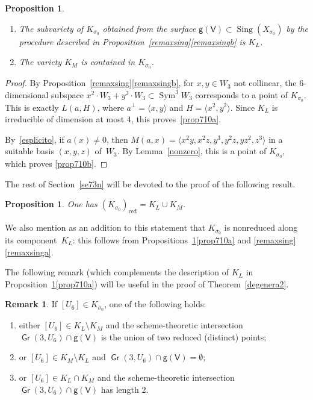 \documentclass[11pt]{article}
\newcommand{\skpt}{\smallskip}
\newenvironment{enumeratea}
{\bgroup\def\theenumi{\alph{enumi}}\def\theenumii{\arabic{enumii}}\begin{enumerate}}
{\end{enumerate}\egroup}
\newtheorem{prop}[lemm]{Proposition}
\theoremstyle{definition}
\newtheorem{rema}[lemm]{Remark}
\newcommand\sfg{\mathsf{g}}
\newcommand\sfV{\mathsf{V}}
\newcommand\gv{\sfg(\sfV)}
\DeclareMathOperator{\Gr}{\mathsf{Gr}}
\let\la\langle
\let\ra\rangle
\DeclareMathOperator{\Sing}{Sing}\let\sing\Sing
\DeclareMathOperator{\Sym}{Sym}
\begin{document}
\skpt
\begin{prop}\label{prop710}
\begin{enumeratea}
\item\label{prop710a}
The subvariety of $K_{\sigma_0}$ obtained from the surface $\gv \subset \Sing(X_{\sigma_0} )$ by the procedure described in Proposition~\ref{remaxsing}\eqref{remaxsingb} is $K_L$.

\item\label{prop710b}
The variety $K_M$ is contained in $K_{\sigma_0}$.
\end{enumeratea}
\end{prop}

\begin{proof}
By Proposition~\ref{remaxsing}\eqref{remaxsingb}, for $x,y\in W_3$ not collinear, the $6$-dimensional subspace $x^2\cdot W_3+y^2\cdot W_3\subset \Sym^3\! W_{3}$ corresponds to a point of $K_{\sigma_0}$. This is exactly $L(a,H)$, where $a^\perp=\la x,y\ra $ and $H=\la x^2,y^2\ra$. Since $K_L$ is irreducible of dimension at most $4$, this proves~\eqref{prop710a}.

By~\eqref{esplicito}, if $a(x)\ne 0$, then $M(a,x)=
\la x^2 y,x^2 z,y^3,y^2 z, y z^2,z^3 \ra $ in a suitable basis $(x,y,z)$ of~$W_{3}$. By Lemma~\ref{nonzero}, this is a point of $K_{\sigma_0}$, which proves \eqref{prop710b}.
\end{proof}

The rest of Section~\ref{se73n} will be devoted to the proof of the following result.

\begin{prop}\label{kappapi}
One has $(K_{\sigma_0})_\mathrm{red} =K_L\cup K_M$.
\end{prop}

We also mention as an addition to this statement that $K_{\sigma_0}$ is nonreduced along its component~$K_L$: this follows from Propositions~\ref{prop710}\eqref{prop710a} and \ref{remaxsing}\eqref{remaxsinga}.

The following remark (which complements the description of $K_L$ in Proposition~\ref{prop710}\eqref{prop710a})
will be useful in the proof of Theorem~\ref{degenera2}.

\begin{rema}\label{interver}
If $[U_6]\in K_{\sigma_0}$, one of the following holds:
\begin{enumeratea}
\item\label{intervera}
either $[U_6]\in K_L \setminus K_M$ and the scheme-theoretic intersection $\Gr(3,U_6)\cap \gv$ is the union of two reduced (distinct) points;
\item\label{interverb}
or $[U_6]\in K_M \setminus K_L $ and $\Gr(3,U_6)\cap \gv=\emptyset$;
\item\label{interverc}
or $[U_6]\in K_L \cap K_M $ and the scheme-theoretic intersection $\Gr(3,U_6)\cap \gv$ has length $2$.
\end{enumeratea}
\end{rema}
\end{document}
